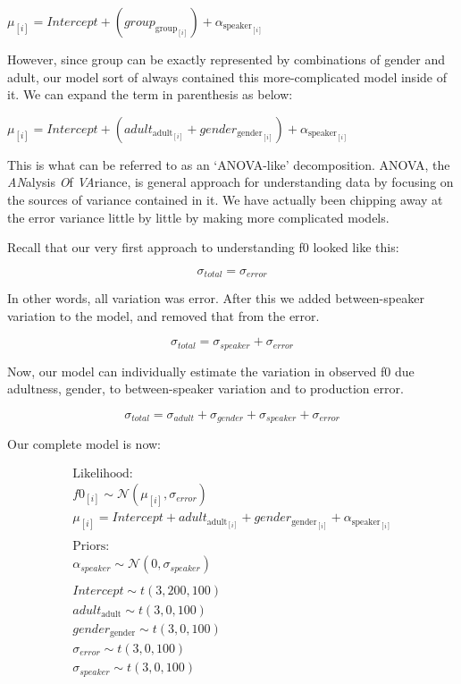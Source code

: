 \documentclass[
]{book}
\begin{document}
\(\mu_{[i]} = Intercept + (group_{\mathrm{group}_{[i]}}) + \alpha_{\mathrm{speaker}_{[i]}}\)

However, since group can be exactly represented by combinations of gender and adult, our model sort of always contained this more-complicated model inside of it. We can expand the term in parenthesis as below:

\(\mu_{[i]} = Intercept + (adult_{\mathrm{adult}_{[i]}} + gender_{\mathrm{gender}_{[i]}}) + \alpha_{\mathrm{speaker}_{[i]}}\)

This is what can be referred to as an `ANOVA-like' decomposition. ANOVA, the \emph{AN}alysis \emph{O}f \emph{VA}riance, is general approach for understanding data by focusing on the sources of variance contained in it. We have actually been chipping away at the error variance little by little by making more complicated models.

Recall that our very first approach to understanding f0 looked like this:

\[
\sigma_{total} = \sigma_{error}
\]

In other words, all variation was error. After this we added between-speaker variation to the model, and removed that from the error.

\[
\sigma_{total} = \sigma_{speaker} + \sigma_{error}
\]

Now, our model can individually estimate the variation in observed f0 due adultness, gender, to between-speaker variation and to production error.

\[
\sigma_{total} = \sigma_{adult} + \sigma_{gender}+\sigma_{speaker} + \sigma_{error}
\]

Our complete model is now:

\begin{equation}
\begin{split}
\textrm{Likelihood:} \\
f0_{[i]} \sim \mathcal{N}(\mu_{[i]},\sigma_{error}) \\
\mu_{[i]} = Intercept + adult_{\mathrm{adult}_{[i]}}+gender_{\mathrm{gender}_{[i]}} + \alpha_{\mathrm{speaker}_{[i]}} \\\\
\textrm{Priors:} \\
\alpha_{speaker} \sim \mathcal{N}(0,\sigma_{speaker}) \\ \\ 
Intercept \sim t(3, 200, 100) \\ 
adult_{\mathrm{adult}} \sim t(3, 0, 100) \\ 
gender_{\mathrm{gender}} \sim t(3, 0, 100) \\ 
\sigma_{error} \sim t(3, 0, 100) \\
\sigma_{speaker} \sim t(3, 0, 100) \\ 
\end{split}
\label{eq:42}
\end{equation}
\end{document}
